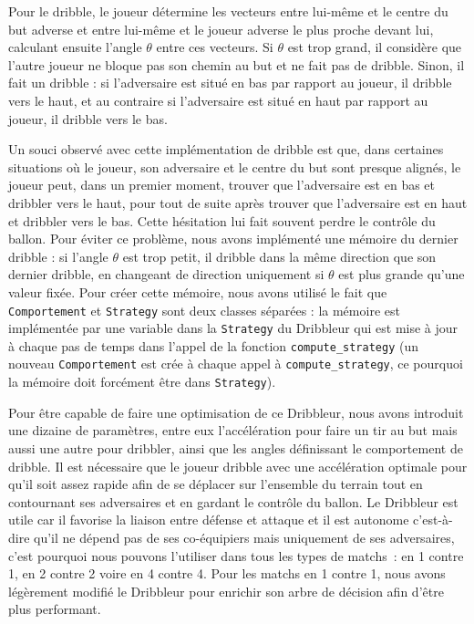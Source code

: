 \documentclass[a4paper,12pt]{article}
\numberwithin{equation}{section}
\begin{document}
Pour le dribble, le joueur détermine les vecteurs entre lui-même et le centre du but adverse et entre lui-même et le joueur adverse le plus proche devant lui, calculant ensuite l'angle $\theta$ entre ces vecteurs. Si $\theta$ est trop grand, il considère que l'autre joueur ne bloque pas son chemin au but et ne fait pas de dribble. Sinon, il fait un dribble : si l’adversaire est situé en bas par rapport au joueur, il dribble vers le haut, et au contraire si l’adversaire est situé en haut par rapport au joueur, il dribble vers le bas.
 
Un souci observé avec cette implémentation de dribble est que, dans certaines \mbox{situations} où le joueur, son adversaire et le centre du but sont presque alignés, le joueur peut, dans un premier moment, trouver que l'adversaire est en bas et dribbler vers le haut, pour tout de suite après trouver que l'adversaire est en haut et dribbler vers le bas. Cette hésitation lui fait souvent perdre le contrôle du ballon. Pour éviter ce problème, nous avons implémenté une mémoire du dernier dribble : si l'angle $\theta$ est trop petit, il dribble dans la même direction que son dernier dribble, en changeant de direction uniquement si $\theta$ est plus grande qu'une valeur fixée. Pour créer cette mémoire, nous avons utilisé le fait que \texttt{Comportement} et \texttt{Strategy} sont deux classes séparées : la mémoire est implémentée par une variable dans la \texttt{Strategy} du Dribbleur qui est mise à jour à chaque pas de temps dans l'appel de la fonction \texttt{compute\_strategy} (un nouveau \texttt{Comportement} est crée à chaque appel à \texttt{compute\_strategy}, ce pourquoi la mémoire doit forcément être dans \texttt{Strategy}).

Pour être capable de faire une optimisation de ce Dribbleur, nous avons introduit une dizaine de paramètres, entre eux l’accélération pour faire un tir au but mais aussi une autre pour dribbler, ainsi que les angles définissant le comportement de dribble. Il est nécessaire que le joueur dribble avec une accélération optimale pour qu’il soit assez rapide afin de se déplacer sur l’ensemble du terrain tout en contournant ses adversaires et en gardant le contrôle du ballon. Le Dribbleur est utile car il favorise la liaison entre défense et attaque et il est autonome c’est-à-dire qu’il ne dépend pas de ses co-équipiers mais uniquement de ses adversaires, c’est pourquoi nous pouvons l’utiliser dans tous les types de matchs : en 1 contre 1, en 2 contre 2 voire en 4 contre 4. Pour les matchs en 1 contre 1, nous avons légèrement modifié le Dribbleur pour enrichir son arbre de décision afin d'être plus performant.
\end{document}
